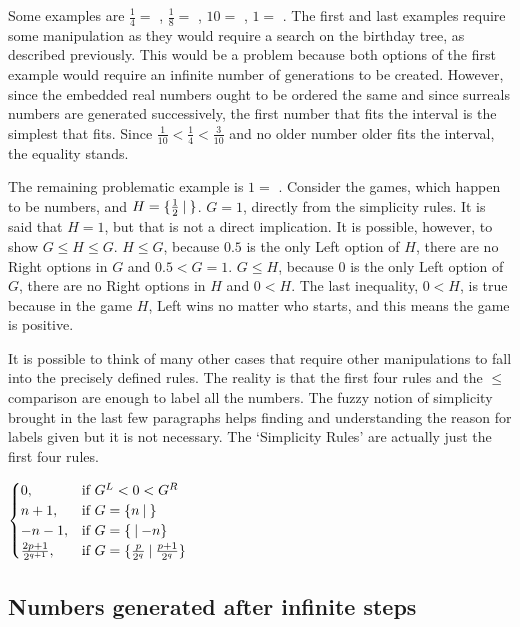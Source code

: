 \vspace{0.6em}Some examples are $\frac{1}{4} =$ , $\frac{1}{8} =$ , $10 =$ , $1 =$ . The first and last examples require some manipulation as they would require a search on the birthday tree, as described previously. This would be a problem because both options of the first example would require an infinite number of generations to be created. However, since the embedded real numbers ought to be ordered the same and since surreals numbers are generated successively, the first number that fits the interval is the simplest that fits. Since $\frac{1}{10} < \frac{1}{4} < \frac{3}{10}$ and no older number older fits the interval, the equality stands.

The remaining problematic example is $1 =$ . Consider the games, which happen to be numbers,  and $H = \mbox{$\{\frac{1}{2}\:|\:\}$}$. $G = 1$, directly from the simplicity rules. It is said that $H = 1$, but that is not a direct implication. It is possible, however, to show $G \leq H \leq G$. $H \leq G$, because $0.5$ is the only Left option of $H$, there are no Right options in $G$ and $0.5 < G = 1$. $G \leq H$, because $0$ is the only Left option of $G$, there are no Right options in $H$ and $0 < H$. The last inequality, $0 < H$, is true because in the game $H$, Left wins no matter who starts, and this means the game is positive.

It is possible to think of many other cases that require other manipulations to fall into the precisely defined rules. The reality is that the first four rules and the $\leq$ comparison are enough to label all the numbers. The fuzzy notion of simplicity brought in the last few paragraphs helps finding and understanding the reason for labels given but it is not necessary. The `Simplicity Rules' are actually just the first four rules.

\begin{center}
	\Gm{ =} 
	$
	\begin{cases}
		0, &\text{if } G^L < 0 < G^R\\
		n+1, &\text{if } \mbox{$G= \mbox{$\{n\:|\:\}$}$}\\
		-n-1, &\text{if } \mbox{$G= \mbox{$\{\:|\:{-}n\}$}$}\\
		\frac{2p + 1}{2^{q+1}}, &\text{if } \mbox{$G= \mbox{$\{\frac{p}{2^q}\:|\: \frac{p+1}{2^q}\}$}$}
	\end{cases}
	$
\end{center}

\subsection*{Numbers generated after infinite steps}

